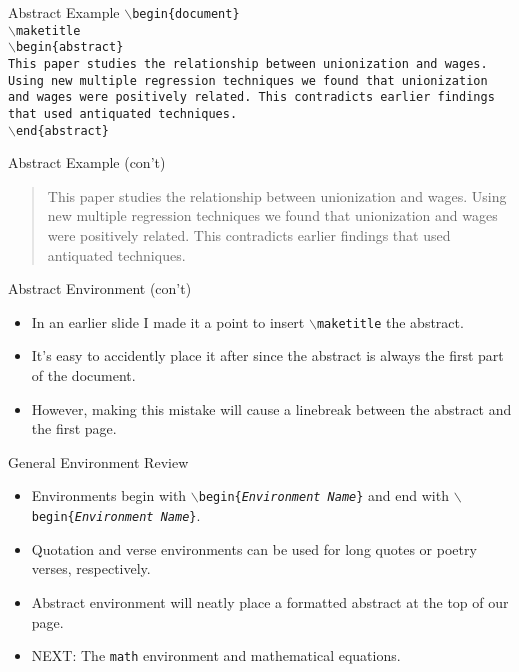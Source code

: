 \documentclass[pdf]{prosper}
\begin{document}
\begin{slide}{Abstract Example}
	\texttt{$\backslash$begin\{document\}} \\
	\texttt{$\backslash$maketitle} \\
	\texttt{$\backslash$begin\{abstract\}} \\
	\texttt{This paper studies the relationship between unionization and wages. Using new multiple regression techniques we found that unionization and wages were positively related. This contradicts earlier findings that used antiquated techniques.} \\
	\texttt{$\backslash$end\{abstract\}} \\
\end{slide}
\begin{slide}{Abstract Example (con't)}
	\begin{abstract}
	This paper studies the relationship between unionization and wages. Using new multiple regression techniques we found that unionization and wages were positively related. This contradicts earlier findings that used antiquated techniques.
	\end{abstract}
\end{slide}
\begin{slide}{Abstract Environment (con't)}
	\begin{itemize}
		\item In an earlier slide I made it a point to insert \texttt{$\backslash$maketitle}  the abstract.
		\item It's easy to accidently place it after since the abstract is always the first part of the document.
		\item However, making this mistake will cause a linebreak between the abstract and the first page.
	\end{itemize}
\end{slide}
\begin{slide}{General Environment Review}
	\begin{itemize}
		\item Environments begin with \texttt{$\backslash$begin\{\textit{Environment Name}\}} and end with \texttt{{$\backslash$begin\{\textit{Environment Name}\}}}.
		\item Quotation and verse environments can be used for long quotes or poetry verses, respectively.
		\item Abstract environment will neatly place a formatted abstract at the top of our page.
		\item NEXT: The \texttt{math} environment and mathematical equations.
	\end{itemize}
\end{slide}
\end{document}
